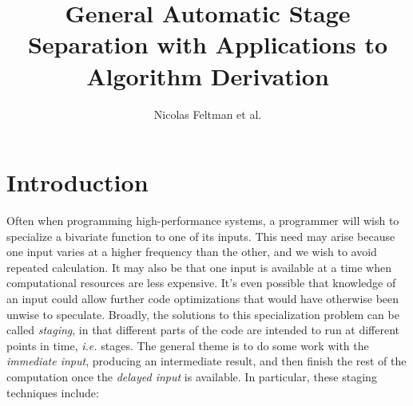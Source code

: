\documentclass{article}
\title{\Large\textbf{General Automatic Stage Separation with Applications to Algorithm Derivation}}
\author{Nicolas Feltman et al.}
\begin{document}
\maketitle
\section{Introduction}
Often when programming high-performance systems, a programmer will wish to specialize a bivariate function to one of its inputs.  This need may arise because one input varies at a higher frequency than the other, and we wish to avoid repeated calculation. It may also be that one input is available at a time when computational resources are less expensive.  It's even possible that knowledge of an input could allow further code optimizations that would have otherwise been unwise to speculate.  Broadly, the solutions to this specialization problem can be called {\it staging}, in that different parts of the code are intended to run at different points in time, {\it i.e.} stages.  The general theme is to do some work with the {\em immediate input}, producing an intermediate result, and then finish the rest of the computation once the {\em delayed input} is available.  In particular, these staging techniques include:
\end{document}
